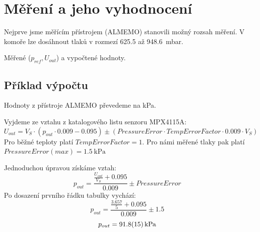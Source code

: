 \documentclass{protokol}
\begin{document}
    \maketitle

    \section{Měření a jeho vyhodnocení }
        Nejprve jsme měřícím přístrojem (ALMEMO) stanovili možný rozsah měření. V komoře lze dosáhnout tlaků v rozmezí \num{625,5} až \qty{948,6}{\milli\bar}. 

    \begin{table}[ht!]
        \caption{Měřené (\(p_{ref}, U_{out}  \)) a vypočtené hodnoty.}
        \def\arraystretch{1.2}
        \centering
        
    \end{table}

    \subsection{Příklad výpočtu}
        Hodnoty z přístroje ALMEMO převedeme na kPa. 

        Vyjdeme ze vztahu z katalogového listu senzoru MPX4115A:
        \[
            U_{out} = V_{S} \cdot (p_{out}\cdot \num{0.009}-\num{0.095})\pm (PressureError \cdot TempErrorFactor\cdot \num{0.009}\cdot V_{S} ) 
        \]
        Pro běžné teploty platí \(TempErrorFactor=1\). Pro námi měřené tlaky pak platí \(PressureError(max)=\qty{1.5}{\kilo\pascal}\) 
        
        Jednoduchou úpravou získáme vztah:
        \[
            p_{out} = \frac{\frac{U_{out}}{V_{S}}+\num{0.095}}{0.009} \pm PressureError
        \]
        Po dosazení prvního řádku tabulky vychází:
        \[
            p_{out} = \frac{\frac{\num{3.657}}{5}+\num{0.095}}{0.009} \pm \num{1.5}
        \]
        \[
            p_{out} = \qty{91.8+-1.5}{kPa}
        \]
\end{document}
